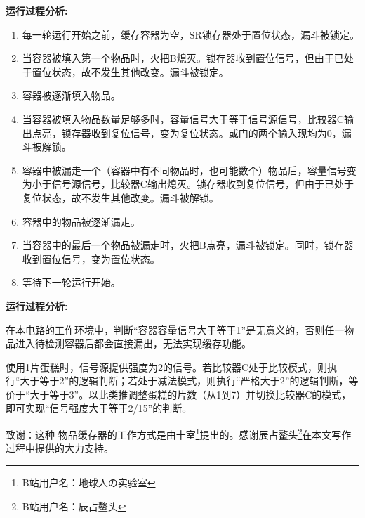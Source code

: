 \documentclass[UTF8,12pt,punct=kaiming,fontset=none]{ctexart}
\begin{document}
{\bfseries 运行过程分析:}
\begin{enumerate}
    \item 每一轮运行开始之前，缓存容器为空，SR锁存器处于置位状态，漏斗被锁定。
    \item 当容器被填入第一个物品时，火把B熄灭。锁存器收到置位信号，但由于已处于置位状态，故不发生其他改变。漏斗被锁定。
    \item 容器被逐渐填入物品。
    \item 当容器被填入物品数量足够多时，容量信号大于等于信号源信号，比较器C输出点亮，锁存器收到复位信号，变为复位状态。或门的两个输入现均为0，漏斗被解锁。
    \item 容器中被漏走一个（容器中有不同物品时，也可能数个）物品后，容量信号变为小于信号源信号，比较器C输出熄灭。锁存器收到复位信号，但由于已处于复位状态，故不发生其他改变。漏斗被解锁。
    \item 容器中的物品被逐渐漏走。
    \item 当容器中的最后一个物品被漏走时，火把B点亮，漏斗被锁定。同时，锁存器收到置位信号，变为置位状态。
    \item 等待下一轮运行开始。
\end{enumerate}

{\bfseries 运行过程分析:}

在本电路的工作环境中，判断“容器容量信号大于等于1”是无意义的，否则任一物品进入待检测容器后都会直接漏出，无法实现缓存功能。

使用1片蛋糕时，信号源提供强度为2的信号。若比较器C处于比较模式，则执行“大于等于2”的逻辑判断；若处于减法模式，则执行“严格大于2”的逻辑判断，等价于“大于等于3”。以此类推调整蛋糕的片数（从1到7）并切换比较器C的模式，即可实现“信号强度大于等于2/15”的判断。
\newline

致谢：这种
物品缓存器的工作方式是由十室\footnote{B站用户名：地球人の实验室}提出的。感谢辰占鳌头\footnote{B站用户名：辰占鳌头}在本文写作过程中提供的大力支持。
\end{document}
